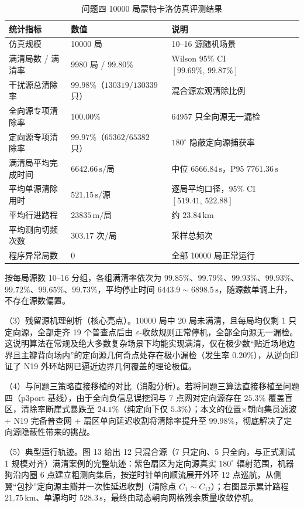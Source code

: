 \documentclass[12pt,a4paper]{article}
\begin{document}
\begin{table}[H]
\centering
\caption{问题四 10000 局蒙特卡洛仿真评测结果}
\small
\begin{tabularx}{\textwidth}{@{}L{3.6cm}L{4.3cm}Y@{}}
\toprule
\textbf{统计指标} & \textbf{数值} & \textbf{说明} \\
\midrule
仿真规模 & 10000 局 & 10--16 源随机场景 \\
满清局数 / 满清率 & 9980 局 / $99.80\%$ & Wilson 95\% CI $[99.69\%,\,99.87\%]$ \\
干扰源总清除率 & $99.98\%$（$130319/130339$ 只） & 混合源宏观清除比例 \\
全向源专项清除率 & $100.00\%$ & 64957 只全向源无一漏检 \\
定向源专项清除率 & $99.97\%$（$65362/65382$ 只） & $180^{\circ}$ 隐蔽定向源捕获率 \\
满清局平均完成时间 & $6642.66\,\mathrm{s}/$局 & 中位 $6566.84\,\mathrm{s}$，P95 $7761.36\,\mathrm{s}$ \\
平均单源清除用时 & $521.15\,\mathrm{s}/$源 & 逐局平均口径，95\% CI $[519.41,\,522.88]$ \\
平均行进路程 & $23835\,\mathrm{m}/$局 & 约 $23.84\,\mathrm{km}$ \\
平均测向切频次数 & $303.17$ 次/局 & 采样总频次 \\
程序异常局数 & 0 & 全部 10000 局正常运行 \\
\bottomrule
\end{tabularx}
\end{table}

按每局源数 10--16 分组，各组满清率依次为 $99.85\%$、$99.79\%$、$99.93\%$、$99.93\%$、$99.72\%$、$99.65\%$、$99.73\%$，平均停止时间 $6443.9{\sim}6898.5\,\mathrm{s}$，随源数单调上升，不存在源数偏置。

（3）残留源机理剖析（核心亮点）。10000 局中 20 局未满清，且每局均仅剩 1 只定向源，全部走齐 19 个普查点后由 $\varepsilon$-收敛规则正常停机，全部全向源无一漏检。这说明算法在常规及绝大多数复杂场景下均能实现满清，仅在极少数“贴近场地边界且主瓣背向场内”的定向源几何奇点处存在极小漏检（发生率 $0.20\%$），从逆向印证了 N19 外环站网已逼近边界几何覆盖的理论极值。

（4）与问题三策略直接移植的对比（消融分析）。若将问题三算法直接移植至问题四（p3port 基线），由于全向负信息误挖洞与 7 点网对定向源存在 $25.3\%$ 覆盖盲区，清除率断崖式暴跌至 $24.1\%$（纯定向下仅 $5.3\%$）；本文的位置$\times$朝向集员滤波 + N19 完备普查网 + 扇区单向延迟收割将清除率提升至 $99.98\%$，彻底解决了定向源隐蔽性带来的挑战。

（5）典型运行轨迹。图 13 给出 12 只混合源（7 只定向、5 只全向，与正式测试 1 规模对齐）满清案例的完整轨迹：紫色扇区为定向源真实 $180^{\circ}$ 辐射范围，机器狗沿内圈 6 点建立粗测向集后，按逆时针单向顺流展开外环 12 点巡航，从侧翼“包抄”定向源主瓣并一次性延迟收割（清除点 $C_1\sim C_{12}$）；右图显示累计路程 $21.75\,\mathrm{km}$、单源均时 $528.3\,\mathrm{s}$，最终由动态朝向网格残余质量收敛停机。
\end{document}
